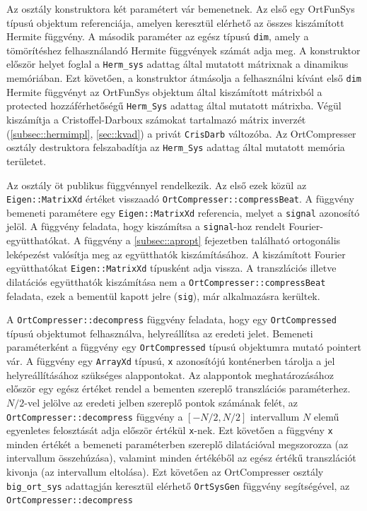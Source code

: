 \documentclass[oneside,titlepage,12pt,a4paper]{report}
\begin{document}
\par Az osztály konstruktora két paramétert vár bemenetnek. Az első egy OrtFunSys típusú objektum referenciája, amelyen keresztül elérhető az összes kiszámított Hermite függvény. A második paraméter az egész típusú \texttt{dim}, amely a tömörítéshez felhasználandó Hermite függvények számát adja meg. A konstruktor először helyet foglal a \texttt{Herm\_sys} adattag által mutatott mátrixnak a dinamikus memóriában. Ezt követően, a konstruktor átmásolja a felhasználni kívánt első \texttt{dim} Hermite függvényt az OrtFunSys objektum által kiszámított mátrixból a protected hozzáférhetőségű \texttt{Herm\_Sys} adattag által mutatott mátrixba. Végül kiszámítja a Cristoffel-Darboux számokat tartalmazó mátrix inverzét (\ref{subsec::hermimpl}, \ref{sec::kvad}) a privát \texttt{CrisDarb} változóba. Az OrtCompresser osztály destruktora felszabadítja az \texttt{Herm\_Sys} adattag által mutatott memória területet. 
\par Az osztály öt publikus függvénnyel rendelkezik. Az első ezek közül az \linebreak \texttt{Eigen::MatrixXd} értéket visszaadó \texttt{OrtCompresser::compressBeat}. A függvény bemeneti paramétere egy \texttt{Eigen::MatrixXd} referencia, melyet a \texttt{signal} azonosító jelöl. A függvény feladata, hogy kiszámítsa a \texttt{signal}-hoz rendelt Fourier-együtthatókat. A függvény a \ref{subsec::apropt} fejezetben található ortogonális leképezést valósítja meg az együtthatók kiszámításához. A kiszámított Fourier együtthatókat \texttt{Eigen::MatrixXd} típusként adja vissza. A transzlációs illetve dilatációs együtthatók kiszámítása nem a \texttt{OrtCompresser::compressBeat} feladata, ezek a bementül kapott jelre (\texttt{sig}), már alkalmazásra kerültek. 
\par A \texttt{OrtCompresser::decompress} függvény feladata, hogy egy \texttt{OrtCompressed} típusú objektumot felhasználva, helyreállítsa az eredeti jelet. Bemeneti paraméterként a függvény egy \texttt{OrtCompressed} típusú objektumra mutató pointert vár. A függvény egy \texttt{ArrayXd} típusú, \texttt{x} azonosítójú konténerben tárolja a jel helyreállításához szükséges alappontokat. Az alappontok meghatározásához először egy egész értéket rendel a bementen szereplő transzlációs paraméterhez. $N/2$-vel jelölve az eredeti jelben szereplő pontok számának felét, az \texttt{OrtCompresser::decompress} függvény a $[-N/2, N/2]$ intervallum $N$ elemű egyenletes felosztását adja először értékül \texttt{x}-nek. Ezt követően a függvény \texttt{x} minden értékét a bemeneti paraméterben szereplő dilatációval megszorozza (az intervallum összehúzása), valamint minden értékéből az egész értékű transzlációt kivonja (az intervallum eltolása). Ezt követően az OrtCompresser osztály \texttt{big\_ort\_sys} adattagján keresztül elérhető \texttt{OrtSysGen} függvény segítségével, az  \texttt{OrtCompresser::decompress}
\end{document}
